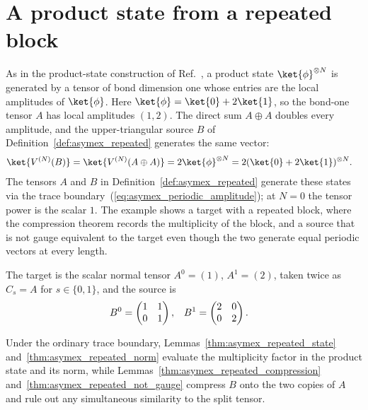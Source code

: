 \section{A product state from a repeated block}%
\label{sec:asymex_repeated}

As in the product-state construction of
Ref.~\cite[Appendix~A]{Cirac2021Matrix}, a product state
$\ket{\phi}^{\otimes N}$ is generated by a tensor of bond dimension one
whose entries are the local amplitudes of $\ket{\phi}$. Here
$\ket{\phi}=\ket{0}+2\ket{1}$, so the bond-one tensor $A$ has local
amplitudes $(1,2)$. The direct sum $A\oplus A$ doubles every amplitude,
and the upper-triangular source $B$ of Definition~\ref{def:asymex_repeated}
generates the same vector:
\begin{align}
    \ket{V^{(N)}(B)}
     & =\ket{V^{(N)}(A\oplus A)} = 2\ket{\phi}^{\otimes N}
    =2(\ket{0}+2\ket{1})^{\otimes N}.
    \label{eq:asymex_repeated_state_eq}
\end{align}
The tensors $A$ and $B$ in Definition~\ref{def:asymex_repeated} generate these
states via the trace boundary~(\ref{eq:asymex_periodic_amplitude}); at $N=0$
the tensor power is the scalar $1$. The example shows a target with a
repeated block, where the compression theorem records the multiplicity
of the block, and a source that is not gauge equivalent to the target
even though the two generate equal periodic vectors at every length.

\begin{definition}
    \label{def:asymex_repeated}
    \leanok
    The target is the scalar normal tensor $A^0=(1)$, $A^1=(2)$, taken
    twice as $C_s=A$ for $s\in\{0,1\}$, and the source is
    \begin{align}
        B^0
         & =\begin{pmatrix}1&1\\0&1\end{pmatrix},
         &
        B^1
         & =\begin{pmatrix}2&0\\0&2\end{pmatrix}.
        \notag
    \end{align}
\end{definition}

Under the ordinary trace boundary,
Lemmas~\ref{thm:asymex_repeated_state}
and~\ref{thm:asymex_repeated_norm} evaluate the multiplicity factor in
the product state and its norm, while
Lemmas~\ref{thm:asymex_repeated_compression}
and~\ref{thm:asymex_repeated_not_gauge} compress $B$ onto the two copies
of $A$ and rule out any simultaneous similarity to the split tensor.

